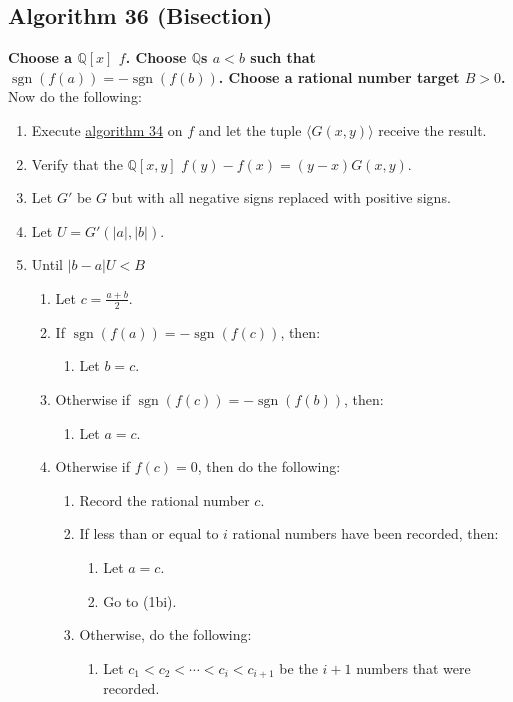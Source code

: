 \documentclass[twocolumn]{article}
\DeclareMathOperator{\sgn}{sgn}
\begin{document}
		\subsection{Algorithm 36 (Bisection)}\label{sec:algorithm 36}
			\textbf{Choose a $\mathbb{Q}[x]$ $f$. Choose $\mathbb{Q}$s $a<b$ such that $\sgn(f(a))=-\sgn(f(b))$. Choose a rational number target $B>0$.} Now do the following:
			\begin{enumerate}
				\item Execute \hyperref[sec:algorithm 34]{algorithm 34} on $f$ and let the tuple $\langle G(x,y)\rangle$ receive the result.
				\item Verify that the $\mathbb{Q}[x,y]$ $f(y)-f(x)=(y-x)G(x,y)$.
				\item Let $G'$ be $G$ but with all negative signs replaced with positive signs.
				\item Let $U=G'(\lvert a\rvert,\lvert b\rvert)$.
				\item Until $\lvert b-a\rvert U<B$
				\begin{enumerate}
					\item Let $c=\frac{a+b}{2}$.
					\item If $\sgn(f(a))=-\sgn(f(c))$, then:
					\begin{enumerate}
						\item Let $b=c$.
					\end{enumerate}
					\item Otherwise if $\sgn(f(c))=-\sgn(f(b))$, then:
					\begin{enumerate}
						\item Let $a=c$.
					\end{enumerate}
					\item Otherwise if $f(c)=0$, then do the following:
					\begin{enumerate}
						\item Record the rational number $c$.
						\item If less than or equal to $i$ rational numbers have been recorded, then:
						\begin{enumerate}
							\item Let $a=c$.
							\item Go to (1bi).
						\end{enumerate}
						\item Otherwise, do the following:
						\begin{enumerate}
							\item Let $c_1<c_2<\cdots<c_i<c_{i+1}$ be the $i+1$ numbers that were recorded.

\end{enumerate}
\end{enumerate}
\end{enumerate}
\end{enumerate}
\end{document}
